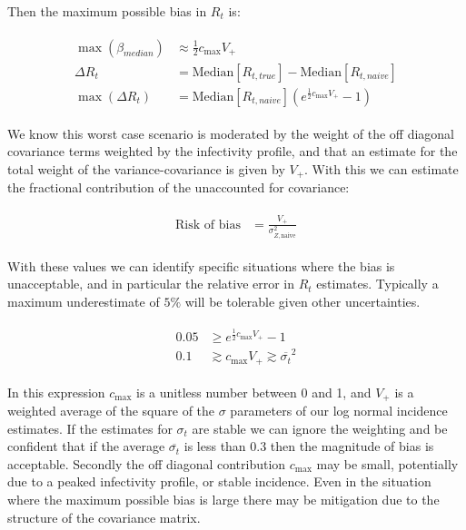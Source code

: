 \documentclass[a4paper, 12pt, twoside]{article}
\begin{document}
Then the maximum possible bias in $ R_t $ is:

\begin{eqnarray}
\begin{aligned}
\max(\beta_{median}) &\approx \frac{1}{2} c_{\text{max}} V_+ \\
\Delta R_t &= \text{Median}[R_{t,true}] - \text{Median}[R_{t,naive}] \\
\max(\Delta R_t) &= \text{Median}[R_{t,naive}] ( e^{ \frac{1}{2} c_{\text{max}} V_+} -1  )
\end{aligned}
\end{eqnarray}

We know this worst case scenario is moderated by the weight of the off diagonal covariance terms weighted by the infectivity profile, and that an estimate for the total weight of the variance-covariance is given by $V_+$. With this we can estimate the fractional contribution of the unaccounted for covariance:

\begin{eqnarray}
\begin{aligned}
\text{Risk of bias} &= \frac{V_+}{\sigma_{Z,\text{naive}}^2}
\end{aligned}
\end{eqnarray}

With these values we can identify specific situations where the bias is unacceptable, and in particular the relative error in $R_t$ estimates. Typically a maximum underestimate of $5\%$ will be tolerable given other uncertainties.

\begin{eqnarray}
\begin{aligned}
0.05 &\ge e^{ \frac{1}{2} c_{\text{max}} V_+} -1 \\
0.1 &\gtrsim c_{\text{max}} V_+ \gtrsim \overline{\sigma_t}^2
\end{aligned}
\end{eqnarray}

In this expression $c_{\text{max}}$ is a unitless number between 0 and 1, and $V_+$ is a weighted average of the square of the $\sigma$ parameters of our log normal incidence estimates. If the estimates for $\sigma_t$ are stable we can ignore the weighting and be confident that if the average $\overline{\sigma_t}$ is less than 0.3 then the magnitude of bias is acceptable. Secondly the off diagonal contribution $ c_{\text{max}} $ may be small, potentially due to a peaked infectivity profile, or stable incidence. Even in the situation where the maximum possible bias is large there may be mitigation due to the structure of the covariance matrix.
\end{document}
